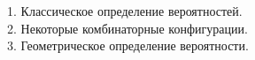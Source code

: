 
1. Классическое определение вероятностей. \\


2. Некоторые комбинаторные конфигурации. \\


3. Геометрическое определение вероятности. \\

